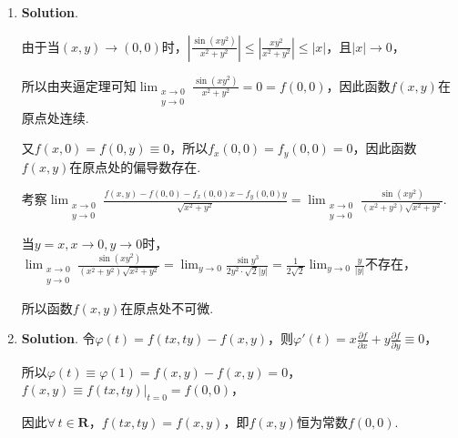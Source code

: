 \documentclass[../Main.tex]{subfiles}
\begin{document}
\begin{enumerate}
          考虑$D$的坐标轴边界. 由对称性不妨只考虑在$y$轴上时，

          此时$x=0$，$z = y^{2}+y=\left(y+\frac{1}{2}\right)^{2}-\frac{1}{4}\in\left[
                  -\frac{1}{4},6\right]$.

          考虑$D$的斜边边界，即直线$x+y=-3$，

          此时$z = x^{2}+(-3-x)^{2}-x(-3-x)+x-3-x = 3x^{2}+9x+6=3\left(x+\frac{3}{2}\right
              )^{2}-\frac{3}{4}\in\left[-\frac{3}{4},6\right]$.

          综上所述，曲面在区域$D$上的最低点为$Q(-1,-1)$，$z(Q)=-1$.

          取平面的法向量为$\boldsymbol{n}= (2,1,-1)\times(1,2,-1) = (1,1,3)$，

          所以平面方程为$x+1+y+1+3(z+1)=0$，即$x+y+3z+5=0$.

    \item \textbf{Solution}.

          由于当$(x,y)\to(0,0)$时，$\left|\frac{\sin(xy^{2})}{x^{2}+y^{2}}\right| \leq
              \left|\frac{xy^{2}}{x^{2}+y^{2}}\right| \leq |x|$，且$|x|\to 0$，

          所以由夹逼定理可知$\lim_{\substack{x\to 0 \\ y\to 0}}\frac{\sin(xy^{2})}{x^{2}+y^{2}}
              =0=f(0,0)$，因此函数$f(x,y)$在原点处连续.

          又$f(x,0)=f(0,y)\equiv 0$，所以$f_{x}(0,0)=f_{y}(0,0)=0$，因此函数$f(x,y)$在原点处的偏导数存在.

          考察$\lim_{\substack{x\to 0 \\ y\to 0}}\frac{f(x,y)-f(0,0)-f_{x}(0,0)x-f_{y}(0,0)y}{\sqrt{x^{2}+y^{2}}}
              = \lim_{\substack{x\to 0 \\ y\to 0}}\frac{\sin(xy^{2})}{(x^{2}+y^{2})\sqrt{x^2+y^2}}$.

          当$y=x,x\to0,y\to0$时，$\lim_{\substack{x\to 0 \\ y\to 0}}\frac{\sin(xy^{2})}{(x^{2}+y^{2})\sqrt{x^2+y^2}}
              = \lim_{y\to0}\frac{\sin y^{3}}{2y^{2}\cdot\sqrt{2}|y|}= \frac{1}{2\sqrt{2}}
              \lim_{y\to0}\frac{y}{|y|}$不存在，

          所以函数$f(x,y)$在原点处不可微.

    \item \textbf{Solution}. 令$\varphi(t)=f(tx,ty)-f(x,y)$，则$\varphi'(t)=
              x\frac{\partial f}{\partial x}+y\frac{\partial f}{\partial y}\equiv0$，

          所以$\varphi(t)\equiv \varphi(1)=f(x,y)-f(x,y)=0$，$f(x,y)\equiv f(tx,ty)\Big
              |_{t=0}= f(0,0)$，

          因此$\forall\,t\in\mathbf{R}$，$f(tx,ty)=f(x,y)$，即$f(x,y)$恒为常数$f(0,0)$.
\end{enumerate}
\end{document}
